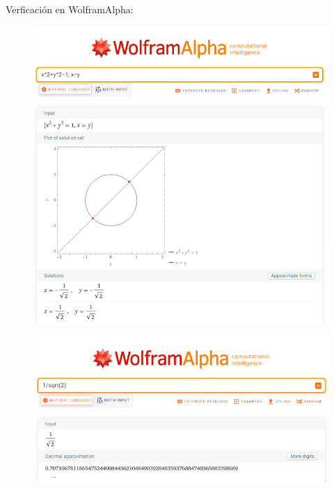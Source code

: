 \documentclass[10pt,letterpaper]{article}
\begin{document}
	Verficación en WolframAlpha:\\
	\begin{figure}[H]
		\includegraphics[width=\textwidth]{imagen8}
		\centering
	\end{figure}
	\begin{figure}[H]
		\includegraphics[width=\textwidth]{imagen9}
		\centering
	\end{figure}
	
\end{document}
